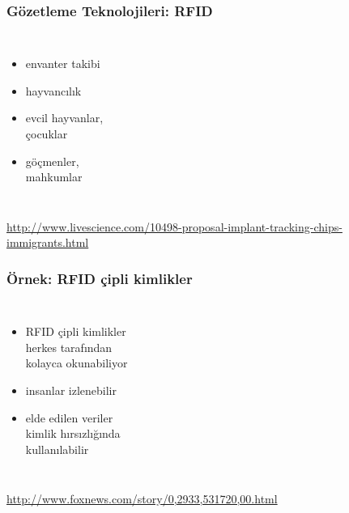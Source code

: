 \documentclass[dvipsnames]{beamer}
\theoremstyle{definition}
\theoremstyle{example}
\theoremstyle{plain}
\begin{document}
\begin{frame}
  \frametitle{Gözetleme Teknolojileri: RFID}

  \begin{columns}
    \begin{itemize}
      \item envanter takibi
      \item hayvancılık

      \pause
      \medskip
      \item evcil hayvanlar,\\
        çocuklar
      \item göçmenler,\\
        mahkumlar
    \end{itemize}

  \end{columns}

  \medskip
  \tiny{\url{http://www.livescience.com/10498-proposal-implant-tracking-chips-immigrants.html}}\\
\end{frame}

\begin{frame}
  \frametitle{Örnek: RFID çipli kimlikler}

  \begin{columns}

    \begin{itemize}
      \item RFID çipli kimlikler\\
        herkes tarafından\\
        kolayca okunabiliyor
      \item insanlar izlenebilir
      \item elde edilen veriler\\
        kimlik hırsızlığında\\
        kullanılabilir
    \end{itemize}
  \end{columns}

  \medskip
  \tiny{\url{http://www.foxnews.com/story/0,2933,531720,00.html}}\\
\end{frame}
\end{document}
